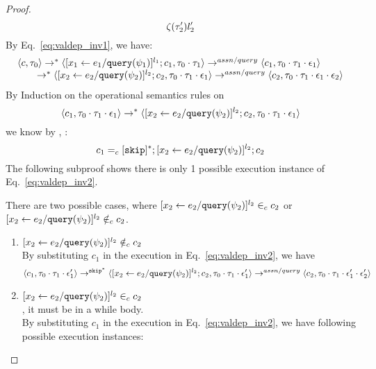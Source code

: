 {\begin{proof}
\begin{equation}
  \mathtt{\zeta}(\mathtt{\tau}_2') l_2'
\end{equation}
%
%
%
 By Eq.~\ref{eq:valdep_inv1}, we have:
\[
  \begin{array}{l}   
\langle {c}, \mathtt{\tau}_0 \rangle \rightarrow^{*} 
\langle [\mathrel{ {x}_1 \leftarrow e_1 / {\tt query}(\psi_1) }]^{l_1} ; {c}_1, \mathtt{\tau}_0 \cdot \mathtt{\tau}_1 \rangle  \rightarrow^{assn/query}
 \langle c_1, \mathtt{\tau}_0 \cdot \mathtt{\tau}_1 \cdot \mathtt{\epsilon}_1 \rangle \\
  \qquad \rightarrow^{*} 
  \langle [\mathrel{ {x}_2 \leftarrow e_2 / {\tt query}(\psi_2) }]^{l_2};{c}_2, 
  \mathtt{\tau}_0 \cdot \mathtt{\tau}_1 \cdot \mathtt{\epsilon}_1 \rangle 
  \rightarrow^{assn/query} 
  \langle {c}_2,  \mathtt{\tau}_0 \cdot \mathtt{\tau}_1 \cdot \mathtt{\epsilon}_1 \cdot \mathtt{\epsilon}_2 \rangle 
\end{array}
 \]
 By Induction on the operational semantics rules on 
 \[\langle c_1, \mathtt{\tau}_0 \cdot \mathtt{\tau}_1 \cdot \mathtt{\epsilon}_1 \rangle
  \rightarrow^{*} 
  \langle [\mathrel{ {x}_2 \leftarrow e_2 / {\tt query}(\psi_2) }]^{l_2};{c}_2, 
  \mathtt{\tau}_0 \cdot \mathtt{\tau}_1 \cdot \mathtt{\epsilon}_1 \rangle \]
 we know by  , :
 \[
 c_1 =_c 
 [\mathtt{skip}]{}^*;[\mathrel{ {x}_2 \leftarrow e_2 / {\tt query}(\psi_2) }]^{l_2};{c}_2
 \]
The following subproof shows there is only 1 possible execution instance of Eq.~\ref{eq:valdep_inv2}.
\begin{subproof}[Subproof]
\label{pf:noiteration_inv2}
There are two possible cases, 
where $[\mathrel{ {x}_2 \leftarrow e_2 / {\tt query}(\psi_2) }]^{l_2} \in_c c_2$ 
or $[\mathrel{ {x}_2 \leftarrow e_2 / {\tt query}(\psi_2) }]^{l_2} \notin_c c_2$.
%
\begin{enumerate}
\item{$[\mathrel{ {x}_2 \leftarrow e_2 / {\tt query}(\psi_2) }]^{l_2}\notin_c c_2$}
\\
By substituting $c_1$ in the execution in Eq.~\ref{eq:valdep_inv2}, we have 
  \[
  \langle c_1, \mathtt{\tau}_0 \cdot \mathtt{\tau}_1 \cdot \mathtt{\epsilon}_1' \rangle 
  \rightarrow^{\mathtt{skip}^*} 
  \langle [\mathrel{ {x}_2 \leftarrow e_2 / {\tt query}(\psi_2) }]^{l_2} ; {c}_2, \mathtt{\tau}_0 \cdot \mathtt{\tau}_1 \cdot \mathtt{\epsilon}_1' \rangle 
  \rightarrow^{assn/query} 
  \langle {c}_2,  \mathtt{\tau}_0 \cdot \mathtt{\tau}_1 \cdot \mathtt{\epsilon}_1' \cdot \mathtt{\epsilon}_2' \rangle 
 \]
%
\item{$[\mathrel{ {x}_2 \leftarrow e_2 / {\tt query}(\psi_2) }]^{l_2} \in_c c_2$}
\\
, it must be in a while body.
\\
 By substituting $c_1$ in the execution in Eq.~\ref{eq:valdep_inv2}, we have following possible execution instances:

\end{enumerate}
\end{subproof}
\end{proof}}
